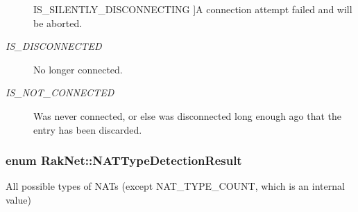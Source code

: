 \begin{Desc}
\begin{description}
{\hypertarget{namespace_rak_net_a84a0fb005391f71130dd341f77f62138afe8d758dec1c59c14662ea85b5ff883e}{I\-S\-\_\-\-S\-I\-L\-E\-N\-T\-L\-Y\-\_\-\-D\-I\-S\-C\-O\-N\-N\-E\-C\-T\-I\-N\-G}\label{namespace_rak_net_a84a0fb005391f71130dd341f77f62138afe8d758dec1c59c14662ea85b5ff883e}
}]A connection attempt failed and will be aborted. \item[{\em 
\hypertarget{namespace_rak_net_a84a0fb005391f71130dd341f77f62138a82261f4327b53e538c68b233d09aa9ea}{I\-S\-\_\-\-D\-I\-S\-C\-O\-N\-N\-E\-C\-T\-E\-D}\label{namespace_rak_net_a84a0fb005391f71130dd341f77f62138a82261f4327b53e538c68b233d09aa9ea}
}]No longer connected. \item[{\em 
\hypertarget{namespace_rak_net_a84a0fb005391f71130dd341f77f62138ae10c6ccb6cfa04d2f55306773457456b}{I\-S\-\_\-\-N\-O\-T\-\_\-\-C\-O\-N\-N\-E\-C\-T\-E\-D}\label{namespace_rak_net_a84a0fb005391f71130dd341f77f62138ae10c6ccb6cfa04d2f55306773457456b}
}]Was never connected, or else was disconnected long enough ago that the entry has been discarded. \end{description}
\end{Desc}
\hypertarget{namespace_rak_net_a81848fd95488939c0b3e217209f31139}{
\subsubsection[{N\-A\-T\-Type\-Detection\-Result}]{\setlength{\rightskip}{0pt plus 5cm}enum {\bf Rak\-Net\-::\-N\-A\-T\-Type\-Detection\-Result}}}\label{namespace_rak_net_a81848fd95488939c0b3e217209f31139}


All possible types of N\-A\-Ts (except N\-A\-T\-\_\-\-T\-Y\-P\-E\-\_\-\-C\-O\-U\-N\-T, which is an internal value) 

